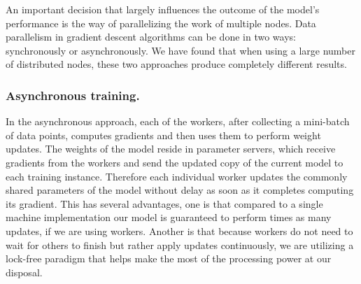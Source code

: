 \documentclass{llncs}
\begin{document}
An important decision that largely influences the outcome of the model's performance is the way of parallelizing the work of multiple nodes. Data parallelism in gradient descent algorithms can be done in two ways: synchronously or asynchronously. We have found that when using a large number of distributed nodes, these two approaches produce completely different results.

\subsubsection{Asynchronous training.} 
In the asynchronous approach, each of the workers, after collecting a mini-batch of data points, computes gradients and then uses them to perform weight updates. The weights of the model reside in parameter servers, which receive gradients from the workers and send the updated copy of the current model to each training instance. Therefore each individual worker updates the commonly shared parameters of the model without delay as soon as it completes computing its gradient. This has several advantages, one is that compared to a single machine implementation our model is guaranteed to perform  times as many updates, if we are using  workers. Another is that because workers do not need to wait for others to finish but rather apply updates continuously, we are utilizing a lock-free paradigm that helps make the most of the processing power at our disposal.
\end{document}
